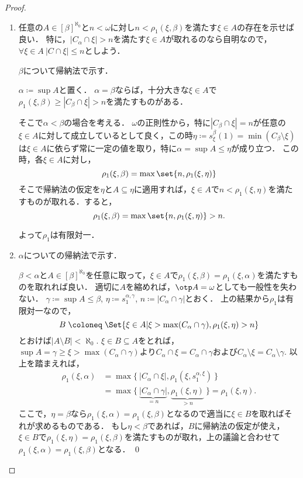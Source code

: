 \documentclass[a4j]{ltjsarticle}
\renewcommand{\defeq}{\mathrel{\coloneq}}
\begin{document}
\begin{proof}
 \begin{enumerate}
  \item 任意の$A \in [\beta]^{\aleph_0}$と$n < \omega$に対し$n < \rho_1(\xi, \beta)$を満たす$\xi \in A$の存在を示せば良い．
        特に，$|C_\alpha \cap \xi| > n$を満たす$\xi \in A$が取れるのなら自明なので，$\forall \xi \in A \: |C \cap \xi| \leq n$としよう．

        $\beta$について帰納法で示す．

        $\alpha \defeq \sup A$と置く．
        $\alpha = \beta$ならば，十分大きな$\xi \in A$で$\rho_1(\xi, \beta) \geq |C_\beta \cap \xi| > n$を満たすものがある．

        そこで$\alpha < \beta$の場合を考える．
        $\omega$の正則性から，特に$|C_\beta \cap \xi| = n$が任意の$\xi \in A$に対して成立しているとして良く，この時$\eta \defeq s^{\beta}_\xi(1) = \min(C_\beta \setminus \xi)$は$\xi \in A$に依らず常に一定の値を取り，特に$\alpha = \sup A \leq \eta$が成り立つ．
        この時，各$\xi \in A$に対し，
        \[
         \rho_1(\xi, \beta) = \max \set{ n, \rho_1(\xi, \eta) }
        \]
         そこで帰納法の仮定を$\eta$と$A \subseteq \eta$に適用すれば，$\xi \in A$で$n < \rho_1(\xi, \eta)$を満たすものが取れる．すると，
        \[
         \rho_1(\xi, \beta) = \max\set{n, \rho_1(\xi, \eta)} > n.
        \]

        よって$\rho_1$は有限対一．
  \item $\alpha$についての帰納法で示す．

        $\beta < \alpha$と$A \in [\beta]^{\aleph_0}$を任意に取って，$\xi \in A$で$\rho_1(\xi, \beta) = \rho_1(\xi, \alpha)$を満たすものを取れれば良い．
        適切に$A$を縮めれば，$\otp A = \omega$としても一般性を失わない．
        $\gamma \defeq \sup A \leq \beta$, $\eta \defeq s^{\alpha,\gamma}_1$, $n \defeq |C_\alpha \cap \gamma|$とおく．
        上の結果から$\rho_1$は有限対一なので，
        \[
         B \defeq \Set{\xi \in A | \xi > \max(C_\alpha \cap \gamma), \rho_1(\xi, \eta) > n }
        \]
        とおけば$|A \setminus B| < \aleph_0$.
        $\xi \in B \subseteq A$をとれば，$\sup A = \gamma \geq \xi > \max(C_\alpha \cap \gamma)$より$C_\alpha \cap \xi = C_\alpha \cap \gamma$および$C_\alpha \setminus \xi = C_\alpha \setminus \gamma$.
        以上を踏まえれば，
        \begin{align*}
         \rho_1(\xi, \alpha) &= \max \{\ |C_\alpha \cap \xi|, \rho_1(\xi, s^{\alpha,\xi}_1) \ \}\\
         &= \max \{\ \underbrace{|C_\alpha \cap \gamma |}_{= n}, \underbrace{\rho_1(\xi, \eta)}_{> n} \ \} = \rho_1(\xi, \eta).
        \end{align*}
        ここで，$\eta = \beta$なら$\rho_1(\xi, \alpha) = \rho_1(\xi, \beta)$となるので適当に$\xi \in B$を取ればそれが求めるものである．
        もし$\eta < \beta$であれば，$B$に帰納法の仮定が使え，$\xi \in B$で$\rho_1(\xi, \eta) = \rho_1(\xi, \beta)$を満たすものが取れ，上の議論と合わせて$\rho_1(\xi, \alpha) = \rho_1(\xi, \beta)$となる． \qed
 \end{enumerate}
\end{proof}
\end{document}
